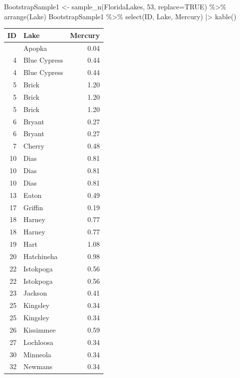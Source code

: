 \documentclass[
  letterpaper,
  DIV=11,
  numbers=noendperiod]{scrreprt}
\newenvironment{Shaded}{\begin{snugshade}}{\end{snugshade}}
\newcommand{\AttributeTok}[1]{\textcolor[rgb]{0.40,0.45,0.13}{#1}}
\newcommand{\ConstantTok}[1]{\textcolor[rgb]{0.56,0.35,0.01}{#1}}
\newcommand{\DecValTok}[1]{\textcolor[rgb]{0.68,0.00,0.00}{#1}}
\newcommand{\FunctionTok}[1]{\textcolor[rgb]{0.28,0.35,0.67}{#1}}
\newcommand{\NormalTok}[1]{\textcolor[rgb]{0.00,0.23,0.31}{#1}}
\newcommand{\OtherTok}[1]{\textcolor[rgb]{0.00,0.23,0.31}{#1}}
\newcommand{\SpecialCharTok}[1]{\textcolor[rgb]{0.37,0.37,0.37}{#1}}
\begin{document}
\begin{Shaded}
\begin{Highlighting}[]
\NormalTok{BootstrapSample1 }\OtherTok{\textless{}{-}} \FunctionTok{sample\_n}\NormalTok{(FloridaLakes, }\DecValTok{53}\NormalTok{, }\AttributeTok{replace=}\ConstantTok{TRUE}\NormalTok{) }\SpecialCharTok{\%\textgreater{}\%} \FunctionTok{arrange}\NormalTok{(Lake)}
\NormalTok{BootstrapSample1 }\SpecialCharTok{\%\textgreater{}\%} \FunctionTok{select}\NormalTok{(ID, Lake, Mercury) }\SpecialCharTok{|\textgreater{}} \FunctionTok{kable}\NormalTok{()}
\end{Highlighting}
\end{Shaded}

\begin{longtable}[]{@{}rlr@{}}
\toprule\noalign{}
ID & Lake & Mercury \\
\midrule\noalign{}
\endhead
\bottomrule\noalign{}
\endlastfoot
3 & Apopka & 0.04 \\
4 & Blue Cypress & 0.44 \\
4 & Blue Cypress & 0.44 \\
5 & Brick & 1.20 \\
5 & Brick & 1.20 \\
5 & Brick & 1.20 \\
6 & Bryant & 0.27 \\
6 & Bryant & 0.27 \\
7 & Cherry & 0.48 \\
10 & Dias & 0.81 \\
10 & Dias & 0.81 \\
10 & Dias & 0.81 \\
13 & Eaton & 0.49 \\
17 & Griffin & 0.19 \\
18 & Harney & 0.77 \\
18 & Harney & 0.77 \\
19 & Hart & 1.08 \\
20 & Hatchineha & 0.98 \\
22 & Istokpoga & 0.56 \\
22 & Istokpoga & 0.56 \\
23 & Jackson & 0.41 \\
25 & Kingsley & 0.34 \\
25 & Kingsley & 0.34 \\
26 & Kissimmee & 0.59 \\
27 & Lochloosa & 0.34 \\
30 & Minneola & 0.34 \\
32 & Newmans & 0.34 \\

\end{longtable}
\end{document}
